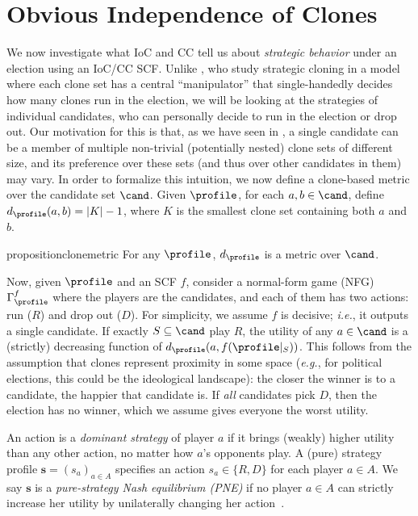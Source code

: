 \section{Obvious Independence of Clones}\label{sec:oioc}
 We now investigate what IoC and CC tell us about \emph{strategic behavior} under an election using an IoC/CC SCF. Unlike \citet{Elkind11:Cloning}, who study strategic cloning in a model where each clone set has a central ``manipulator'' that single-handedly decides how many clones run in the election, we will be looking at the strategies of individual candidates, who can personally decide to run in the election or drop out. Our motivation for this is that, as we have seen in , a single candidate can be a member of multiple non-trivial (potentially nested) clone sets of different size, and its preference over these sets (and thus over other candidates in them) may vary. In order to formalize this intuition, we now define a clone-based metric over the candidate set $\cand$. Given $\profile$, for each  $a,b \in \cand$, define $d_{\profile}(a,b)=  |K| -1$, where $K$ is the smallest clone set containing both $a$ and $b$.

\begin{restatable}{proposition}{clonemetric}\label{prop:metric}
    For any $\profile$, $d_{\profile}$ is a metric over $\cand$. 
\end{restatable}
 
Now, given $\profile$ and an SCF $f$, consider a normal-form game (NFG) $\Gamma^f_{\profile}$ where the players are the candidates, and each of them has two actions: run ($R$) and drop out ($D$). For simplicity, we assume $f$ is decisive; \emph{i.e.}, it outputs a single candidate. If exactly $S \subseteq \cand$ play $R$, the utility of any $a \in \cand$ is a (strictly) decreasing function of $d_{\profile}(a, f(\profile|_S))$. This follows from the assumption that clones represent proximity in some space (\emph{e.g.}, for political elections, this could be the ideological landscape): the closer the winner is to a candidate, the happier that candidate is.  If \emph{all} candidates pick $D$, then the election has no winner, which we assume gives everyone the worst utility. 

An action is a \emph{dominant strategy} of player $a$ if it brings (weakly) higher utility than any other action, no matter how $a$'s opponents play. A (pure) strategy profile  $\boldsymbol{s}=(s_a)_{a \in A}$ specifies an action $s_a \in \{R,D\}$ for each player $a \in A$. We say $\boldsymbol{s}$ is a \emph{pure-strategy Nash equilibrium (PNE)} if no player $a\in A$ can strictly increase her utility by unilaterally changing her action~\citep{Nash50:Non}. 

